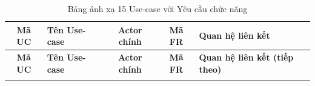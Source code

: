 \documentclass[12pt,a4paper]{article}
\begin{document}
\vspace{0.2cm}
\noindent
\footnotesize
\renewcommand{\arraystretch}{1.25}
\begin{xltabular}{\textwidth}{|c|>{\raggedright\arraybackslash}p{3.2cm}|c|c|>{\raggedright\arraybackslash}X|}
\caption{Bảng ánh xạ 15 Use-case với Yêu cầu chức năng} \label{tab:usecases} \\
\hline
{}
\textbf{Mã UC} & \textbf{Tên Use-case} & \textbf{Actor chính} & \textbf{Mã FR} & \textbf{Quan hệ liên kết} \\
\hline
\endfirsthead

\hline
{}
\textbf{Mã UC} & \textbf{Tên Use-case} & \textbf{Actor chính} & \textbf{Mã FR} & \textbf{Quan hệ liên kết (tiếp theo)} \\
\hline
\endhead

\hline
\endfoot

\hline
\endlastfoot


\end{xltabular}
\end{document}

